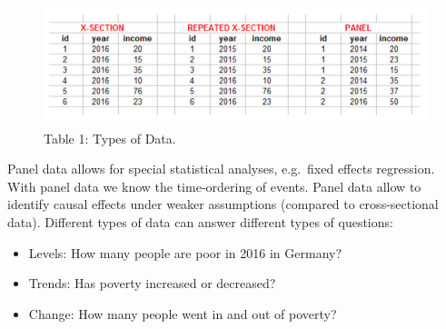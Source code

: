 \documentclass[
]{book}
\providecommand{\tightlist}{%
  \setlength{\itemsep}{0pt}\setlength{\parskip}{0pt}}
\begin{document}
\begin{figure}

{\centering \includegraphics[width=0.7\linewidth]{images/paneldata} 

}

\caption{\label{fig:wb}Table 1: Types of Data.}\label{fig:unnamed-chunk-40}
\end{figure}

Panel data allows for special statistical analyses, e.g.~fixed effects regression. With panel data we know the time-ordering of events. Panel data allow to identify causal effects under weaker assumptions (compared to cross-sectional data). Different types of data can answer different types of questions:

\begin{itemize}
\tightlist
\item
  Levels: How many people are poor in 2016 in Germany?
\item
  Trends: Has poverty increased or decreased?
\item
  Change: How many people went in and out of poverty?
\end{itemize}
\end{document}
